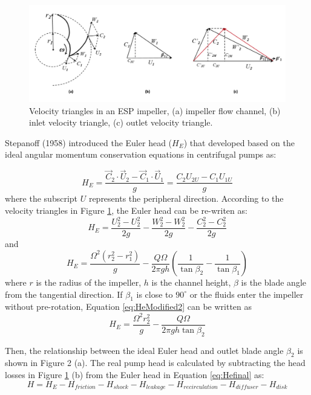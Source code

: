 \documentclass[preprint,12pt]{elsarticle}
\begin{document}
\begin{figure}[h]
\label{fig:velocityTriangle}
\centering\includegraphics[width=1\linewidth]{velocity triangle.jpg}
\caption{Velocity triangles in an ESP impeller, (a) impeller flow channel, (b) inlet velocity triangle, (c) outlet velocity triangle.}
\end{figure}

Stepanoff (1958) introduced the Euler head ($H_E$) that developed based on the ideal angular momentum conservation equations in centrifugal pumps as:

\begin{equation}
    \label{eq:HeOriginal}
    H_E = \frac{\vec C_2\cdot\vec U_2-\vec C_1\cdot\vec U_1}{g}=\frac{C_2U_{2U}-C_1U_{1U}}{g}
\end{equation}
where the subscript $U$ represents the peripheral direction. According to the velocity triangles in Figure \ref{fig:velocityTriangle}, the Euler head can be re-writen as:
\begin{equation}
    \label{eq:HeModified}
    H_E = \frac{U_2^2-U_2^2}{2g}-\frac{W_2^2-W_2^2}{2g}-\frac{C_2^2-C_2^2}{2g}
\end{equation}
and
\begin{equation}
    \label{eq:HeModified2}
    H_E = \frac{\Omega^2(r_2^2-r_1^2)}{g}-\frac{Q\Omega}{2\pi gh}(\frac{1}{\tan{\beta_2}}-\frac{1}{\tan{\beta_1}})
\end{equation}
where $r$ is the radius of the impeller, $h$ is the channel height, $\beta$ is the blade angle from the tangential direction. If $\beta_1$ is close to ${90^{\circ}}$ or the fluids enter the impeller without pre-rotation, Equation \ref{eq:HeModified2} can be written as
\begin{equation}
    \label{eq:Hefinal}
    H_E=\frac{\Omega^2r_2^2}{g}-\frac{Q\Omega}{2\pi gh \tan{\beta_2}}
\end{equation}

Then, the relationship between the ideal Euler head and outlet blade angle $\beta_2$ is shown in Figure 2 (a). The real pump head is calculated by subtracting the head losses in Figure \ref{fig:velocityTriangle} (b) from the Euler head in Equation \ref{eq:Hefinal} as: 
\begin{equation}
    \label{eq:headall}
    H=H_E-H_{friction}-H_{shock}-H_{leakage}-H_{recirculation}-H_{diffuser}-H_{disk}
\end{equation}
\end{document}
